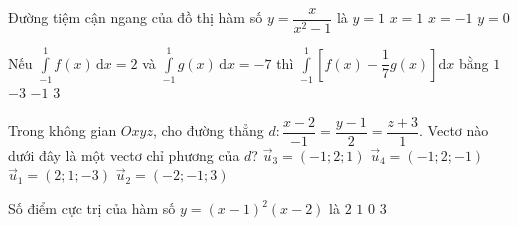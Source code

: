 \begin{ex}%
	Đường tiệm cận ngang của đồ thị hàm số $y=\dfrac{x}{x^2-1}$ là
	\choice
	{$y=1$}
	{$x=1$}
	{$x=-1$}
	{\True $y=0$}
\end{ex}

\begin{ex}%
	Nếu $\displaystyle\int\limits_{-1}^1f(x)\mathrm{\,d}x=2$ và $\displaystyle\int\limits_{-1}^1g(x)\mathrm{\,d}x=-7$ thì $\displaystyle\int\limits_{-1}^1\left[f(x)-\dfrac{1}{7}g(x)\right]\mathrm{d}x$ bằng
	\choice
	{$1$}
	{$-3$}
	{$-1$}
	{\True $3$}
\end{ex}

\begin{ex}%
	Trong không gian $Oxyz$, cho đường thẳng $d\colon\dfrac{x-2}{-1}=\dfrac{y-1}{2}=\dfrac{z+3}{1}$. Vectơ nào dưới đây là một vectơ chỉ phương của $d$?
	\choice
	{\True $\overrightarrow{u}_3=\left(-1;2;1\right)$}
	{$\overrightarrow{u}_4=\left(-1;2;-1\right)$}
	{$\overrightarrow{u}_1=\left(2;1;-3\right)$}
	{$\overrightarrow{u}_2=\left(-2;-1;3\right)$}
\end{ex}

\begin{ex}%
	Số điểm cực trị của hàm số $y=(x-1)^2 (x-2)$ là
	\choice
	{\True $2$}
	{$1$}
	{$0$}
	{$3$}
\end{ex}

